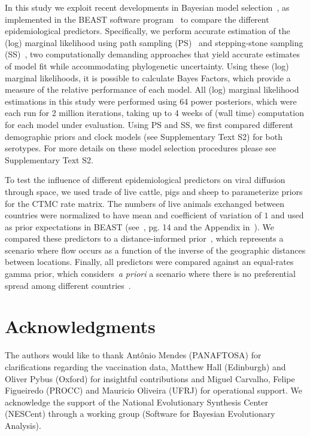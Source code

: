 \documentclass[10pt]{article}
\begin{document}
In this study we exploit recent developments in Bayesian model selection~\cite{Baele2012, Baele2013a, Baele2013b, Baele2013c}, as implemented in the BEAST software program~\cite{beast2012} to compare the different epidemiological predictors.
Specifically, we perform accurate estimation of the (log) marginal likelihood using path sampling (PS)~\cite{LartillotPhilippe} and stepping-stone sampling (SS)~\cite{Xie}, two computationally demanding approaches that yield accurate estimates of model fit while accommodating phylogenetic uncertainty.
Using these (log) marginal likelihoods, it is possible to calculate Bayes Factors, which provide a measure of the relative performance of each model. 
All (log) marginal likelihood estimations in this study were performed using 64 power posteriors, which were each run for 2 million iterations, taking up to 4 weeks of (wall time) computation for each model under evaluation. 
Using PS and SS, we first compared different demographic priors and clock models (see Supplementary Text S2) for both serotypes. 
For more details on these model selection procedures please see Supplementary Text S2.

To test the influence of different epidemiological predictors on viral diffusion through space, we used trade of live cattle, pigs and sheep to parameterize priors for the CTMC rate matrix.
The numbers of live animals exchanged between countries were normalized to have mean and coefficient of variation of $1$ and used as prior expectations in BEAST (see~\cite{roots}, pg. 14 and the Appendix in~\cite{Carvalho2013}).  
We compared these predictors to a distance-informed prior~\cite{roots}, which represents a scenario where flow occurs as a function of the inverse of the geographic distances between locations.
Finally, all predictors were compared against an equal-rates gamma prior, which considers~\textit{a priori} a scenario where there is no preferential spread among different countries~\cite{Nelson2011}.

\section*{Acknowledgments}
The authors would like to thank Ant\^onio Mendes (PANAFTOSA) for clarifications regarding the vaccination data, Matthew Hall (Edinburgh) and Oliver Pybus (Oxford) for insightful contributions and Miguel Carvalho, Felipe Figueiredo (PROCC) and Mauricio Oliveira (UFRJ) for operational support.
We acknowledge the support of the National Evolutionary Synthesis Center (NESCent) through a working group (Software for Bayesian Evolutionary Analysis).
\end{document}
